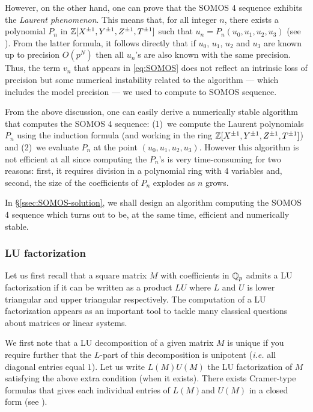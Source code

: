\documentclass{lms}
\begin{document}
However, on the other hand, one can prove that the SOMOS 4 sequence 
exhibits the \emph{Laurent phenomenon}. This means that, for all integer 
$n$, there exists a polynomial $P_n$ in $\mathbb Z[X^{\pm 1}, Y^{\pm 1}, Z^{\pm 
1}, T^{\pm 1}]$ such that $u_n = P_n(u_0, u_1, u_2, u_3)$ (see \cite{Fomin-Zelevinsky}).
From the latter formula, it follows directly that if $u_0$, $u_1$,
$u_2$ and $u_3$ are known up to precision $O(p^N)$ then all $u_n$'s
are also known with the same precision. Thus, the term $v_n$ that 
appears in \eqref{eq:SOMOS} does not reflect an intrinsic loss of
precision but some numerical instability related to the algorithm ---
which includes the model precision --- we used to compute to SOMOS 
sequence.

\begin{rmk}
From the above discussion, one can easily derive a numerically stable 
algorithm that computes the SOMOS 4 sequence: (1)~we compute the 
Laurent polynomials $P_n$ using the induction formula (and working in 
the ring $\mathbb Z[X^{\pm 1}, Y^{\pm 1}, Z^{\pm 1}, T^{\pm 1}]$) and (2)~we 
evaluate $P_n$ at the point $(u_0, u_1, u_2, u_3)$.
However this algorithm is not efficient at all since computing the 
$P_n$'s is very time-consuming for two reasons: first, it requires 
division in a polynomial ring with $4$ variables and, second, the
size of the coefficients of $P_n$ explodes as $n$ grows.

In \S \ref{ssec:SOMOS-solution}, we shall design an algorithm computing 
the SOMOS 4 sequence which turns out to be, at the same time, efficient 
and numerically stable.
\end{rmk}

\subsubsection*{LU factorization}

Let us first recall that a square matrix $M$ with coefficients in $\mathbb Q_p$ 
admits a LU factorization if it can be written as a product $LU$ where 
$L$ and $U$ is lower triangular and upper triangular respectively. 
The computation of a LU factorization appears as an important tool to 
tackle many classical questions about matrices or linear systems.

We first note that a LU decomposition of a given matrix $M$ is unique
if you require further that the $L$-part of this decomposition is
unipotent (\emph{i.e.} all diagonal entries equal $1$). Let us write
$L(M) U(M)$ the LU factorization of $M$ satisfying the above extra
condition (when it exists). There exists Cramer-type formulas that
gives each individual entries of $L(M)$and $U(M)$ in a closed form
(see \cite{Caruso}).
\end{document}
